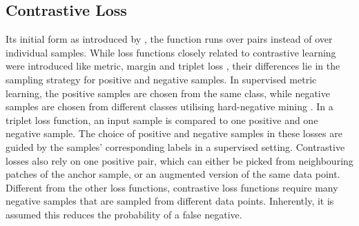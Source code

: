 \subsection{Contrastive Loss}
Its initial form as introduced by \cite{contrastiveloss}, the function runs over pairs instead of over individual samples. While loss functions closely related to contrastive learning were introduced like metric, margin and triplet loss \cite{8014803, marginloss, chechik_large_2009}, their differences lie in the sampling strategy for positive and negative samples. In supervised metric learning, the positive samples are chosen from the same class, while negative samples are chosen from different classes utilising hard-negative mining \cite{8014803}. In a triplet loss function, an input sample is compared to one positive and one negative sample. The choice of positive and negative samples in these losses are guided by the samples' corresponding labels in a supervised setting. Contrastive losses also rely on one positive pair, which can either be picked from neighbouring patches of the anchor sample, or an augmented version of the same data point. Different from the other loss functions, contrastive loss functions require many negative samples that are sampled from different data points. Inherently, it is assumed this reduces the probability of a false negative.




